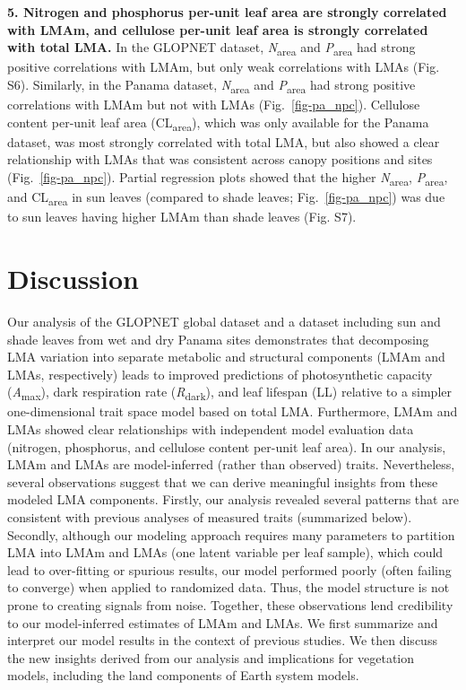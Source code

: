 \documentclass[
  12pt,
  letterpaper,
  DIV=11,
  numbers=noendperiod]{scrartcl}
\begin{document}
\textbf{5. Nitrogen and phosphorus per-unit leaf area are strongly
correlated with LMAm, and cellulose per-unit leaf area is strongly
correlated with total LMA.} In the GLOPNET dataset,
\emph{N}\textsubscript{area} and \emph{P}\textsubscript{area} had strong
positive correlations with LMAm, but only weak correlations with LMAs
(Fig. S6). Similarly, in the Panama dataset,
\emph{N}\textsubscript{area} and \emph{P}\textsubscript{area} had strong
positive correlations with LMAm but not with LMAs
(Fig.~\ref{fig-pa_npc}). Cellulose content per-unit leaf area
(CL\textsubscript{area}), which was only available for the Panama
dataset, was most strongly correlated with total LMA, but also showed a
clear relationship with LMAs that was consistent across canopy positions
and sites (Fig.~\ref{fig-pa_npc}). Partial regression plots showed that
the higher \emph{N}\textsubscript{area}, \emph{P}\textsubscript{area},
and CL\textsubscript{area} in sun leaves (compared to shade leaves;
Fig.~\ref{fig-pa_npc}) was due to sun leaves having higher LMAm than
shade leaves (Fig. S7).

\hypertarget{discussion}{%
\section{Discussion}\label{discussion}}

Our analysis of the GLOPNET global dataset and a dataset including sun
and shade leaves from wet and dry Panama sites demonstrates that
decomposing LMA variation into separate metabolic and structural
components (LMAm and LMAs, respectively) leads to improved predictions
of photosynthetic capacity (\emph{A}\textsubscript{max}), dark
respiration rate (\emph{R}\textsubscript{dark}), and leaf lifespan (LL)
relative to a simpler one-dimensional trait space model based on total
LMA. Furthermore, LMAm and LMAs showed clear relationships with
independent model evaluation data (nitrogen, phosphorus, and cellulose
content per-unit leaf area). In our analysis, LMAm and LMAs are
model-inferred (rather than observed) traits. Nevertheless, several
observations suggest that we can derive meaningful insights from these
modeled LMA components. Firstly, our analysis revealed several patterns
that are consistent with previous analyses of measured traits
(summarized below). Secondly, although our modeling approach requires
many parameters to partition LMA into LMAm and LMAs (one latent variable
per leaf sample), which could lead to over-fitting or spurious results,
our model performed poorly (often failing to converge) when applied to
randomized data. Thus, the model structure is not prone to creating
signals from noise. Together, these observations lend credibility to our
model-inferred estimates of LMAm and LMAs. We first summarize and
interpret our model results in the context of previous studies. We then
discuss the new insights derived from our analysis and implications for
vegetation models, including the land components of Earth system models.
\end{document}
